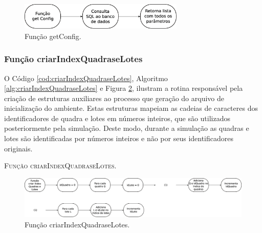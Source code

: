\begin{figure}[H]
  \centering
  \includegraphics[width=0.7\textwidth]{Figuras/Simula/Fluxos/getConfig.eps}
  \caption{Função getConfig.}
  \label{fig:getConfig}
\end{figure} 

\newpage

\subsubsection{Função criarIndexQuadraseLotes}

O Código \ref{cod:criarIndexQuadraseLotes}, Algoritmo \ref{alg:criarIndexQuadraseLotes} e Figura \ref{fig:criarIndexQuadraseLotes}, ilustram a rotina responsável pela criação de estruturas auxiliares ao processo que geração do arquivo de inicialização do ambiente. Estas estruturas mapeiam as cadeias de caracteres dos identificadores de quadra e lotes em números inteiros, que são utilizados posteriormente pela simulação. Deste modo, durante a simulação as quadras e lotes são identificadas por números inteiros e não por seus identificadores originais. 



\begin{algorithm}[H]
   \SetAlgoLined   
   
   \caption{\textsc{Função criarIndexQuadraseLotes.}}
   \label{alg:criarIndexQuadraseLotes}
\end{algorithm}

\begin{figure}[H]
  \centering
  \includegraphics[width=1\textwidth]{Figuras/Simula/Fluxos/criarIndexQuadraseLotes.eps}
  \caption{Função criarIndexQuadraseLotes.}
  \label{fig:criarIndexQuadraseLotes}
\end{figure} 

\newpage

